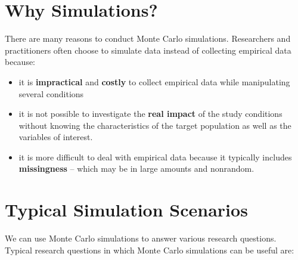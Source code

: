 \documentclass[
]{book}
\providecommand{\tightlist}{%
  \setlength{\itemsep}{0pt}\setlength{\parskip}{0pt}}
\begin{document}
\hypertarget{why-simulations}{%
\section{Why Simulations?}\label{why-simulations}}

There are many reasons to conduct Monte Carlo simulations. Researchers and practitioners often choose to simulate data instead of collecting empirical data because:

\begin{itemize}
\tightlist
\item
  it is \textbf{impractical} and \textbf{costly} to collect empirical data while manipulating several conditions
\item
  it is not possible to investigate the \textbf{real impact} of the study conditions without knowing the characteristics of the target population as well as the variables of interest.
\item
  it is more difficult to deal with empirical data because it typically includes \textbf{missingness} -- which may be in large amounts and nonrandom.
\end{itemize}

\hypertarget{typical-simulation-scenarios}{%
\section{Typical Simulation Scenarios}\label{typical-simulation-scenarios}}

We can use Monte Carlo simulations to answer various research questions. Typical research questions in which Monte Carlo simulations can be useful are:
\end{document}
